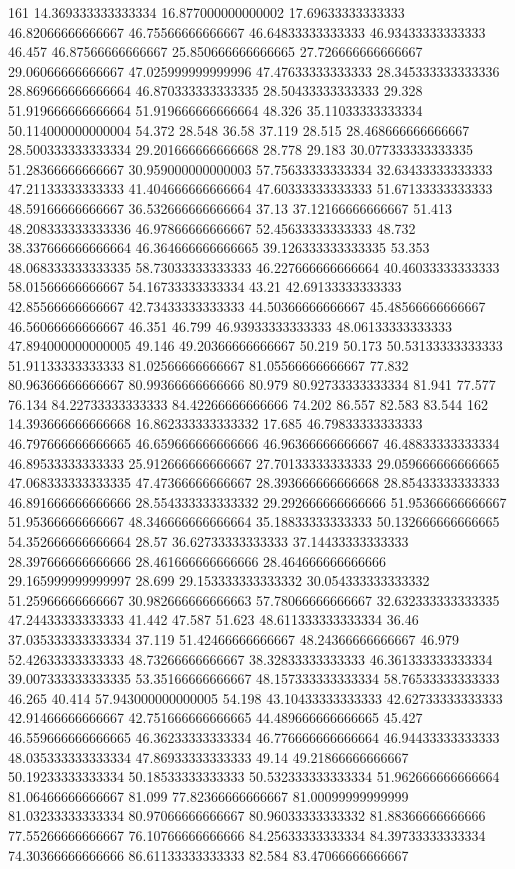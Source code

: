 161 14.369333333333334 16.877000000000002 17.69633333333333 46.82066666666667 46.75566666666667 46.64833333333333 46.93433333333333 46.457 46.87566666666667 25.850666666666665 27.726666666666667 29.06066666666667 47.025999999999996 47.47633333333333 28.345333333333336 28.869666666666664 46.870333333333335 28.50433333333333 29.328 51.919666666666664 51.919666666666664 48.326 35.11033333333334 50.114000000000004 54.372 28.548 36.58 37.119 28.515 28.468666666666667 28.500333333333334 29.201666666666668 28.778 29.183 30.077333333333335 51.28366666666667 30.959000000000003 57.75633333333334 32.63433333333333 47.21133333333333 41.404666666666664 47.60333333333333 51.67133333333333 48.59166666666667 36.532666666666664 37.13 37.12166666666667 51.413 48.208333333333336 46.97866666666667 52.45633333333333 48.732 38.337666666666664 46.364666666666665 39.126333333333335 53.353 48.068333333333335 58.73033333333333 46.227666666666664 40.46033333333333 58.01566666666667 54.16733333333334 43.21 42.69133333333333 42.85566666666667 42.73433333333333 44.50366666666667 45.48566666666667 46.56066666666667 46.351 46.799 46.93933333333333 48.06133333333333 47.894000000000005 49.146 49.20366666666667 50.219 50.173 50.53133333333333 51.91133333333333 81.02566666666667 81.05566666666667 77.832 80.96366666666667 80.99366666666666 80.979 80.92733333333334 81.941 77.577 76.134 84.22733333333333 84.42266666666666 74.202 86.557 82.583 83.544
162 14.393666666666668 16.862333333333332 17.685 46.79833333333333 46.797666666666665 46.659666666666666 46.96366666666667 46.48833333333334 46.89533333333333 25.912666666666667 27.70133333333333 29.059666666666665 47.068333333333335 47.47366666666667 28.393666666666668 28.85433333333333 46.891666666666666 28.554333333333332 29.292666666666666 51.95366666666667 51.95366666666667 48.346666666666664 35.18833333333333 50.132666666666665 54.352666666666664 28.57 36.62733333333333 37.14433333333333 28.397666666666666 28.461666666666666 28.464666666666666 29.165999999999997 28.699 29.153333333333332 30.054333333333332 51.25966666666667 30.982666666666663 57.78066666666667 32.632333333333335 47.24433333333333 41.442 47.587 51.623 48.611333333333334 36.46 37.035333333333334 37.119 51.42466666666667 48.24366666666667 46.979 52.42633333333333 48.73266666666667 38.32833333333333 46.361333333333334 39.007333333333335 53.35166666666667 48.157333333333334 58.76533333333333 46.265 40.414 57.943000000000005 54.198 43.10433333333333 42.62733333333333 42.91466666666667 42.751666666666665 44.489666666666665 45.427 46.559666666666665 46.36233333333334 46.776666666666664 46.94433333333333 48.035333333333334 47.86933333333333 49.14 49.21866666666667 50.19233333333334 50.18533333333333 50.532333333333334 51.962666666666664 81.06466666666667 81.099 77.82366666666667 81.00099999999999 81.03233333333334 80.97066666666667 80.96033333333332 81.88366666666666 77.55266666666667 76.10766666666666 84.25633333333334 84.39733333333334 74.30366666666666 86.61133333333333 82.584 83.47066666666667
